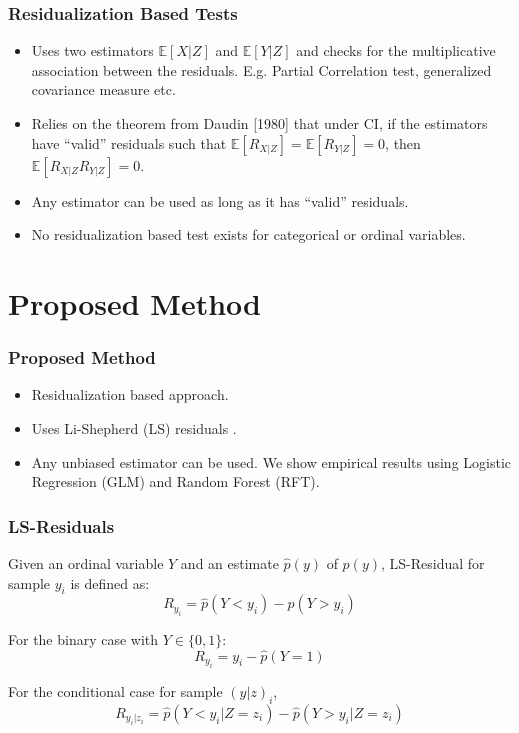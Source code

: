 \documentclass{beamer}
\begin{document}
\begin{frame}
	\frametitle{Residualization Based Tests}
	\begin{itemize}
		\setlength\itemsep{1em}
		\item Uses two estimators $ \mathbb{E}[X| Z] $ and $
			\mathbb{E}[Y | Z] $ and checks for the multiplicative
			association between the residuals. E.g.
			Partial Correlation test, generalized covariance measure etc.
		\item Relies on the theorem from Daudin [1980] \footnotemark 
			that under CI, if the estimators have ``valid'' residuals
			such that $ \mathbb{E}[R_{X|Z}] = \mathbb{E}[R_{Y|Z}] = 0 $,
			then $ \mathbb{E}[R_{X|Z} R_{Y|Z}] = 0 $.
		\item Any estimator can be used as long as it has ``valid'' residuals.
		\item No residualization based test exists for categorical or ordinal variables.
	\end{itemize}
\end{frame}

\section{Proposed Method}
\begin{frame}
	\frametitle{Proposed Method}
	\begin{itemize}
		\setlength\itemsep{1em}
		\item Residualization based approach.
		\item Uses Li-Shepherd (LS) residuals \footnotemark.
		\item Any unbiased estimator can be used. We show empirical results using Logistic Regression (GLM) and Random Forest (RFT).
	\end{itemize}
\end{frame}

\begin{frame}
	\frametitle{LS-Residuals}
	Given an ordinal variable $ Y $ and an estimate $ \hat{p}(y) $ of $
	p(y) $, LS-Residual for sample $ y_i $ is defined as:
	$$ R_{y_i} = \hat{p}(Y < y_i) - \hat{p}(Y > y_i) $$
	\vspace{1em}

	For the binary case with $ Y \in \{0, 1\} $:
	$$ R_{y_i} = y_i - \hat{p}(Y = 1) $$
	\vspace{1em}

	For the conditional case for sample $ (y|z)_i $,
	$$ R_{y_i | z_i} = \hat{p}(Y < y_i | Z=z_i) - \hat{p}(Y>y_i|Z=z_i) $$

\end{frame}
\end{document}

